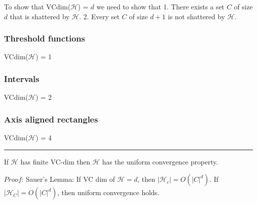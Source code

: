 To show that VCdim($\mathcal{H}$) = $d$ we need to show that
1. There exists a set $C$ of size $d$ that is shattered by $\mathcal{H}$.
2. Every set $C$ of size $d + 1$ is not shattered by $\mathcal{H}$.

\subsubsection{Threshold functions}
VCdim($\mathcal{H}$) = 1

\subsubsection{Intervals}
VCdim($\mathcal{H}$) = 2

\subsubsection{Axis aligned rectangles}
VCdim($\mathcal{H}$) = 4

\hrule height 0.06pt
\medskip

If $\mathcal{H}$ has finite VC-dim then $\mathcal{H}$ has the uniform convergence property.

$\textit{Proof}$: 
Sauer's Lemma: If VC dim of $\mathcal{H} = d$, then $|\mathcal{H}_c| = O(|C|^d)$. If $|\mathcal{H}_C| = O(|C|^d)$, then uniform convergence holds.




